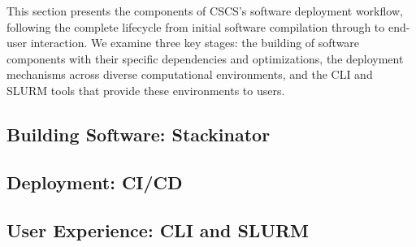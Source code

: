 This section presents the components of CSCS's software deployment workflow, following the complete lifecycle from initial software compilation through to end-user interaction.
We examine three key stages: the building of software components with their specific dependencies and optimizations, the deployment mechanisms across diverse computational environments, and the CLI and SLURM tools that provide these environments to users.

\subsection{Building Software: Stackinator}
\label{sec:stackinator}


\subsection{Deployment: CI/CD}
\label{sec:cicd}


\subsection{User Experience: CLI and SLURM}
\label{sec:cli}

